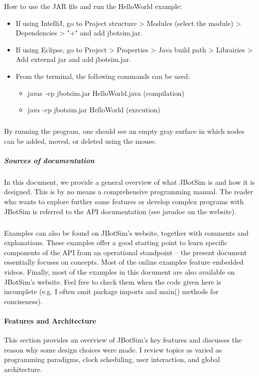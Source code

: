 How to use the JAR file and run the HelloWorld example:
\begin{itemize}
	\item If using IntelliJ, go to Project structure > Modules (select the module) > Dependencies > "+" and add jbotsim.jar.
	\item If using Eclipse, go to Project > Properties > Java build path > Librairies > Add external jar and add jbotsim.jar.
	\item From the terminal, the following commands can be used:
		\begin{itemize}
			\item javac -cp jbotsim.jar HelloWorld.java (compilation)
			\item java -cp jbotsim.jar HelloWorld (execution)
		\end{itemize}
\end{itemize}

\subparagraph{}By running the program, one should see an empty gray surface in which nodes can be added, moved, or deleted using the mouse.
\subparagraph{Sources of documentation}In this document, we provide a general overview of what JBotSim is and how it is designed. This is by no means a comprehensive programming manual. The reader who wants to explore further some features or develop complex programs with JBotSim is referred to the API documentation (see javadoc on the website). \subparagraph{}Examples can also be found on JBotSim's website, together with comments and explanations. These examples offer a good starting point to learn specific components of the API from an operational standpoint – the present document essentially focuses on concepts. Most of the online examples feature embedded videos. Finally, most of the examples in this document are also available on JBotSim's website. Feel free to check them when the code given here is incomplete (e.g. I often omit package imports and main() methods for conciseness).
\paragraph{Features and Architecture}This section provides an overview of JBotSim's key features and discusses the reason why some design choices were made. I review topics as varied as programming paradigms, clock scheduling, user interaction, and global architecture.

